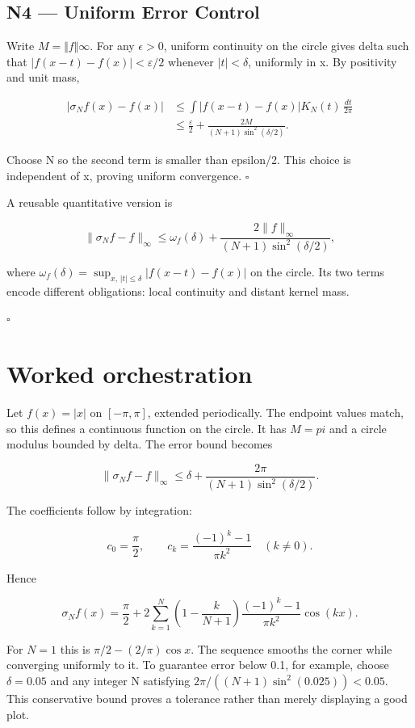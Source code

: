 \documentclass[preprint,12pt,aps,pra,showkeys,amsmath,amssymb,superscriptaddress,floatfix]{revtex4-2}
\theoremstyle{definition}
\theoremstyle{remark}
\begin{document}
\subsection{N4 --- Uniform Error
Control}\label{n4-uniform-error-control}

Write \(M=\Vert f\Vert \infty\). For any \(\epsilon >0\), uniform
continuity on the circle gives delta such that
\(|f(x-t)-f(x)|<\varepsilon/2\) whenever \(|t|<\delta\), uniformly in x.
By positivity and unit mass,

\[\begin{aligned}
|\sigma_Nf(x)-f(x)|
&\le\int|f(x-t)-f(x)|K_N(t)\,\frac{dt}{2\pi}\\
&\le\frac\varepsilon2+\frac{2M}{(N+1)\sin^2(\delta/2)}.
\end{aligned}\]

Choose N so the second term is smaller than epsilon/2. This choice is
independent of x, proving uniform convergence. \(\square\)

A reusable quantitative version is

\[\|\sigma_Nf-f\|_\infty\le\omega_f(\delta)+\frac{2\|f\|_\infty}{(N+1)\sin^2(\delta/2)},\]

where \(\omega_f(\delta)=\sup_{x,\,|t|\le\delta}|f(x-t)-f(x)|\) on the
circle. Its two terms encode different obligations: local continuity and
distant kernel mass.

\hfill$\square$

\section{Worked orchestration}

Let \(f(x)=|x|\) on \([-\pi ,\pi ]\), extended periodically. The
endpoint values match, so this defines a continuous function on the
circle. It has \(M=pi\) and a circle modulus bounded by delta. The error
bound becomes

\[\|\sigma_Nf-f\|_\infty\le\delta+\frac{2\pi}{(N+1)\sin^2(\delta/2)}.\]

The coefficients follow by integration:

\[c_0=\frac\pi2,\qquad c_k=\frac{(-1)^k-1}{\pi k^2}\quad(k\ne0).\]

Hence

\[\sigma_Nf(x)=\frac\pi2+2\sum_{k=1}^N\left(1-\frac{k}{N+1}\right)\frac{(-1)^k-1}{\pi k^2}\cos(kx).\]

For \(N=1\) this is \(\pi/2-(2/\pi)\cos x\). The sequence smooths the
corner while converging uniformly to it. To guarantee error below 0.1,
for example, choose \(\delta =0.05\) and any integer N satisfying
\(2\pi/((N+1)\sin^2(0.025))<0.05\). This conservative bound proves a
tolerance rather than merely displaying a good plot.
\end{document}
